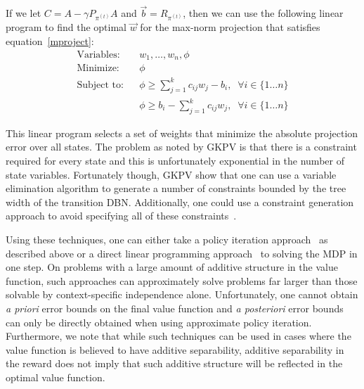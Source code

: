 
If we let $C = A  - \gamma P_{\pi^{(t)}} A$ and $\vec{b} = R_{\pi^{(t)}}$, then we can use the 
following linear program to find the optimal $\vec{w}$ for the max-norm projection that satisfies
equation~\ref{mproject}:
\begin{eqnarray*}
\textrm{Variables:}  & & w_1, \ldots, w_n, \phi \\
\textrm{Minimize:}   & & \phi \\
\textrm{Subject to:} & & \phi \geq \sum_{j=1}^{k} c_{ij}w_j - b_i, \; \; \forall i \in \{ 1 \ldots n \} \\
                     & & \phi \geq b_i - \sum_{j=1}^{k} c_{ij}w_j, \; \; \forall i \in \{ 1 \ldots n \}
\end{eqnarray*}

This linear program
selects a set of weights that minimize the absolute projection error over
all states.  The problem as noted by GKPV is that there is a constraint
required for every state and this is unfortunately exponential in the
number of state variables.  Fortunately though, GKPV show that one can use a
variable elimination algorithm to generate a number of constraints
bounded by the tree width of the transition DBN.  Additionally, one
could use a constraint generation approach to avoid specifying all of
these constraints~\cite{relu}.

Using these techniques, one can either take a policy iteration approach~\cite{gkp}
as described above or a direct linear programming approach~\cite{directva} to solving
the MDP in one step.  On problems with a large amount of additive structure in the
value function, such approaches can approximately solve problems far larger
than those solvable by context-specific independence alone.
Unfortunately, one cannot obtain \emph{a priori} error bounds on the final value
function and \emph{a posteriori} error bounds 
can only be directly obtained when using approximate policy iteration.
Furthermore, we note that
while such techniques can be used in cases where the value function is
believed to have additive separability, additive separability in
the reward does not imply that such additive structure will be
reflected in the optimal value function.

